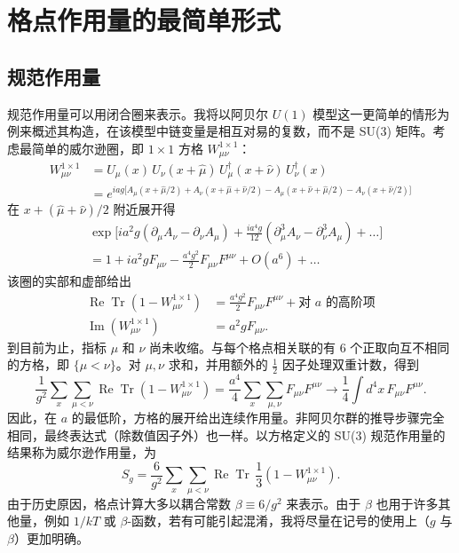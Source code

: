 \chapter{格点作用量的最简单形式}

\section{规范作用量}

规范作用量可以用闭合圈来表示。我将以阿贝尔 $U(1)$ 模型这一更简单的情形为例来概述其构造，在该模型中链变量是相互对易的复数，而不是 SU(3) 矩阵。考虑最简单的威尔逊圈，即 $1\times1$ 方格 $W_{\mu\nu}^{1\times1}$：
\begin{equation}
\label{eq:plaqexpA}
\begin{aligned}
W_{\mu\nu}^{1\times1} &= U_\mu(x)\, U_\nu(x+\hat{\mu})\, U_\mu^\dagger(x+\hat{\nu})\, U_\nu^\dagger(x) \\
&= e^{iag\big[ A_\mu(x+\hat{\mu}/2) + A_\nu(x+\hat{\mu}+\hat{\nu}/2) -
          A_\mu(x+\hat{\nu}+\hat{\mu}/2) - A_\nu(x+\hat{\nu}/2) \big]}
\end{aligned}
\end{equation}
在 $x + (\hat{\mu}+\hat{\nu})/2$ 附近展开得
\begin{equation}
\label{eq:plaqexpB}
\begin{aligned}
&\exp\Big[ ia^2g(\partial_\mu A_\nu - \partial_\nu A_\mu) +
       \frac{ia^4g}{12}(\partial_\mu^3 A_\nu - \partial_\nu^3 A_\mu) + \ldots \Big] \\
&= 1 + ia^2gF_{\mu\nu} - \frac{a^4g^2}{2}F_{\mu\nu}F^{\mu\nu} + O(a^6) + \ldots
\end{aligned}
\end{equation}
该圈的实部和虚部给出
\begin{equation}
\label{eq:plaqexpC}
\begin{aligned}
\operatorname{Re}\operatorname{Tr}(1-W_{\mu\nu}^{1\times1}) &=
   \frac{a^4g^2}{2}F_{\mu\nu}F^{\mu\nu} + \text{对 } a \text{ 的高阶项} \\
\operatorname{Im}(W_{\mu\nu}^{1\times1}) &= a^2gF_{\mu\nu} .
\end{aligned}
\end{equation}
到目前为止，指标 $\mu$ 和 $\nu$ 尚未收缩。与每个格点相关联的有 $6$ 个正取向互不相同的方格，即 $\{\mu<\nu\}$。对 $\mu,\nu$ 求和，并用额外的 $\frac{1}{2}$ 因子处理双重计数，得到
\[
\frac{1}{g^2}\sum_x\sum_{\mu<\nu}\operatorname{Re}\operatorname{Tr}(1-W_{\mu\nu}^{1\times1})
= \frac{a^4}{4}\sum_x\sum_{\mu,\nu}F_{\mu\nu}F^{\mu\nu}
\to \frac{1}{4}\int d^4x\, F_{\mu\nu}F^{\mu\nu} .
\]
因此，在 $a$ 的最低阶，方格的展开给出连续作用量。非阿贝尔群的推导步骤完全相同，最终表达式（除数值因子外）也一样。以方格定义的 SU(3) 规范作用量的结果称为威尔逊作用量，为
\begin{equation}
\label{eq:Wgaugeaction}
S_g = \frac{6}{g^2}\sum_x\sum_{\mu<\nu}\operatorname{Re}\operatorname{Tr}\,
      \frac{1}{3}(1-W_{\mu\nu}^{1\times1}) .
\end{equation}
由于历史原因，格点计算大多以耦合常数 $\beta \equiv 6/g^2$ 来表示。由于 $\beta$ 也用于许多其他量，例如 $1/kT$ 或 $\beta$-函数，若有可能引起混淆，我将尽量在记号的使用上（$g$ 与 $\beta$）更加明确。

